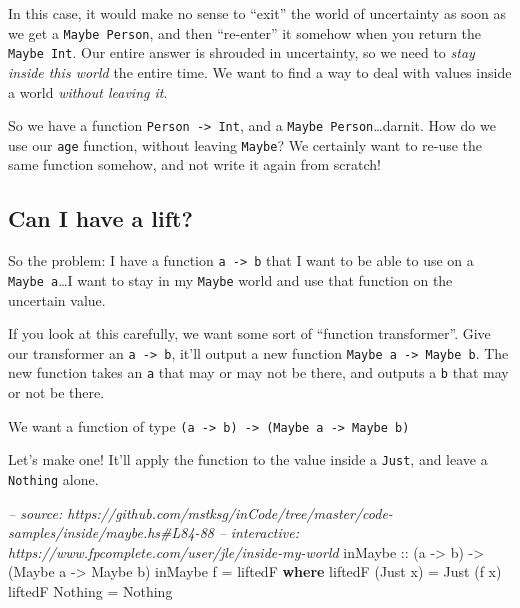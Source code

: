 \documentclass[]{article}
\newenvironment{Shaded}{\begin{snugshade}}{\end{snugshade}}
\newcommand{\CommentTok}[1]{\textcolor[rgb]{0.56,0.35,0.01}{\textit{#1}}}
\newcommand{\DataTypeTok}[1]{\textcolor[rgb]{0.13,0.29,0.53}{#1}}
\newcommand{\FunctionTok}[1]{\textcolor[rgb]{0.00,0.00,0.00}{#1}}
\newcommand{\KeywordTok}[1]{\textcolor[rgb]{0.13,0.29,0.53}{\textbf{#1}}}
\newcommand{\NormalTok}[1]{#1}
\newcommand{\OtherTok}[1]{\textcolor[rgb]{0.56,0.35,0.01}{#1}}
\begin{document}
In this case, it would make no sense to ``exit'' the world of uncertainty as
soon as we get a \texttt{Maybe\ Person}, and then ``re-enter'' it somehow when
you return the \texttt{Maybe\ Int}. Our entire answer is shrouded in
uncertainty, so we need to \emph{stay inside this world} the entire time. We
want to find a way to deal with values inside a world \emph{without leaving it}.

So we have a function \texttt{Person\ -\textgreater{}\ Int}, and a
\texttt{Maybe\ Person}\ldots{}darnit. How do we use our \texttt{age} function,
without leaving \texttt{Maybe}? We certainly want to re-use the same function
somehow, and not write it again from scratch!

\hypertarget{can-i-have-a-lift}{%
\subsection{Can I have a lift?}\label{can-i-have-a-lift}}

So the problem: I have a function \texttt{a\ -\textgreater{}\ b} that I want to
be able to use on a \texttt{Maybe\ a}\ldots{}I want to stay in my \texttt{Maybe}
world and use that function on the uncertain value.

If you look at this carefully, we want some sort of ``function transformer''.
Give our transformer an \texttt{a\ -\textgreater{}\ b}, it'll output a new
function \texttt{Maybe\ a\ -\textgreater{}\ Maybe\ b}. The new function takes an
\texttt{a} that may or may not be there, and outputs a \texttt{b} that may or
not be there.

We want a function of type
\texttt{(a\ -\textgreater{}\ b)\ -\textgreater{}\ (Maybe\ a\ -\textgreater{}\ Maybe\ b)}

Let's make one! It'll apply the function to the value inside a \texttt{Just},
and leave a \texttt{Nothing} alone.

\begin{Shaded}
\begin{Highlighting}[]
\CommentTok{-- source: https://github.com/mstksg/inCode/tree/master/code-samples/inside/maybe.hs#L84-88}
\CommentTok{-- interactive: https://www.fpcomplete.com/user/jle/inside-my-world}
\OtherTok{inMaybe ::}\NormalTok{ (a }\OtherTok{->}\NormalTok{ b) }\OtherTok{->}\NormalTok{ (}\DataTypeTok{Maybe}\NormalTok{ a }\OtherTok{->} \DataTypeTok{Maybe}\NormalTok{ b)}
\NormalTok{inMaybe f }\FunctionTok{=}\NormalTok{ liftedF}
  \KeywordTok{where}
\NormalTok{    liftedF (}\DataTypeTok{Just}\NormalTok{ x) }\FunctionTok{=} \DataTypeTok{Just}\NormalTok{ (f x)}
\NormalTok{    liftedF }\DataTypeTok{Nothing}  \FunctionTok{=} \DataTypeTok{Nothing}
\end{Highlighting}
\end{Shaded}
\end{document}
